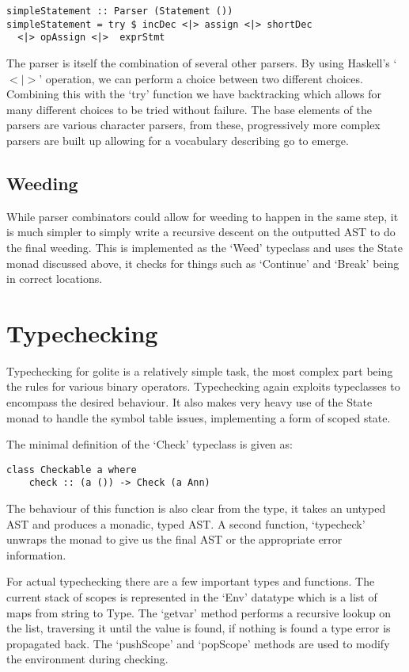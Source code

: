 \documentclass[11pt]{article}
\begin{document}
\begin{lstlisting}
simpleStatement :: Parser (Statement ())
simpleStatement = try $ incDec <|> assign <|> shortDec 
  <|> opAssign <|>  exprStmt
\end{lstlisting}

The parser is itself the combination of several other parsers. By using Haskell's `$<|>$' operation, we can perform a choice between two different choices. Combining this with the `try' function we have backtracking which allows for many different choices to be tried without failure. The base elements of the parsers are various character parsers, from these, progressively more complex parsers are built up allowing for a vocabulary describing go to emerge. 

\subsection{Weeding}

While parser combinators could allow for weeding to happen in the same step, it is much simpler to simply write a recursive descent on the outputted AST to do the final weeding. This is implemented as the `Weed' typeclass and uses the State monad discussed above, it checks for things such as `Continue' and `Break' being in correct locations. 

\section{Typechecking}

Typechecking for golite is a relatively simple task, the most complex part being the rules for various binary operators. Typechecking again exploits typeclasses to encompass the desired behaviour. It also makes very heavy use of the State monad to handle the symbol table issues, implementing a form of scoped state. 

The minimal definition of the `Check' typeclass is given as:
\begin{lstlisting}
class Checkable a where
    check :: (a ()) -> Check (a Ann)
\end{lstlisting}

The behaviour of this function is also clear from the type, it takes an untyped AST and produces a monadic, typed AST. A second function, `typecheck' unwraps the monad to give us the final AST or the appropriate error information.

For actual typechecking there are a few important types and functions. The current stack of scopes is represented in the `Env' datatype which is a list of maps from string to Type. The `getvar' method performs a recursive lookup on the list, traversing it until the value is found, if nothing is found a type error is propagated back. The `pushScope' and `popScope' methods are used to modify the environment during checking. 
\end{document}
